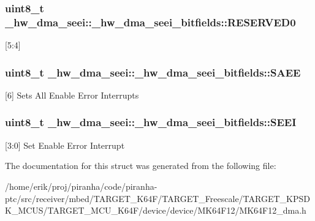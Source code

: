 \subsubsection[{\texorpdfstring{R\+E\+S\+E\+R\+V\+E\+D0}{RESERVED0}}]{\setlength{\rightskip}{0pt plus 5cm}uint8\+\_\+t \+\_\+hw\+\_\+dma\+\_\+seei\+::\+\_\+hw\+\_\+dma\+\_\+seei\+\_\+bitfields\+::\+R\+E\+S\+E\+R\+V\+E\+D0}\hypertarget{struct__hw__dma__seei_1_1__hw__dma__seei__bitfields_aff9e40f1161180f3d5ec6abf25af08a8}{}\label{struct__hw__dma__seei_1_1__hw__dma__seei__bitfields_aff9e40f1161180f3d5ec6abf25af08a8}
\mbox{[}5\+:4\mbox{]} 
\subsubsection[{\texorpdfstring{S\+A\+EE}{SAEE}}]{\setlength{\rightskip}{0pt plus 5cm}uint8\+\_\+t \+\_\+hw\+\_\+dma\+\_\+seei\+::\+\_\+hw\+\_\+dma\+\_\+seei\+\_\+bitfields\+::\+S\+A\+EE}\hypertarget{struct__hw__dma__seei_1_1__hw__dma__seei__bitfields_a9789e77f2186fcf3f33080b93d2ac32d}{}\label{struct__hw__dma__seei_1_1__hw__dma__seei__bitfields_a9789e77f2186fcf3f33080b93d2ac32d}
\mbox{[}6\mbox{]} Sets All Enable Error Interrupts 
\subsubsection[{\texorpdfstring{S\+E\+EI}{SEEI}}]{\setlength{\rightskip}{0pt plus 5cm}uint8\+\_\+t \+\_\+hw\+\_\+dma\+\_\+seei\+::\+\_\+hw\+\_\+dma\+\_\+seei\+\_\+bitfields\+::\+S\+E\+EI}\hypertarget{struct__hw__dma__seei_1_1__hw__dma__seei__bitfields_a03463ebe947d7f3bc5f5be9052600487}{}\label{struct__hw__dma__seei_1_1__hw__dma__seei__bitfields_a03463ebe947d7f3bc5f5be9052600487}
\mbox{[}3\+:0\mbox{]} Set Enable Error Interrupt 

The documentation for this struct was generated from the following file\+:\begin{DoxyCompactItemize}
\item 
/home/erik/proj/piranha/code/piranha-\/ptc/src/receiver/mbed/\+T\+A\+R\+G\+E\+T\+\_\+\+K64\+F/\+T\+A\+R\+G\+E\+T\+\_\+\+Freescale/\+T\+A\+R\+G\+E\+T\+\_\+\+K\+P\+S\+D\+K\+\_\+\+M\+C\+U\+S/\+T\+A\+R\+G\+E\+T\+\_\+\+M\+C\+U\+\_\+\+K64\+F/device/device/\+M\+K64\+F12/M\+K64\+F12\+\_\+dma.\+h\end{DoxyCompactItemize}
